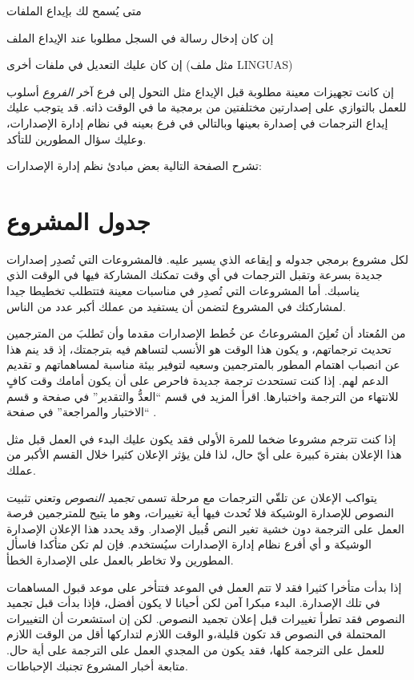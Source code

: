 \startitemize[1]
\item متى يُسمح لك بإيداع الملفات
\item إن كان إدخال رسالة في السجل مطلوبا عند الإيداع الملف
\item إن كان عليك التعديل في ملفات أخرى (مثل ملف LINGUAS)
\item إن كانت تجهيزات معينة مطلوبة قبل الإيداع مثل التحول إلى فرع آخر
\stopitemize
{\it الفروع} أسلوب للعمل بالتوازي على إصدارتين مختلفتين من برمجية ما في
الوقت ذاته. قد يتوجب عليك إيداع الترجمات في إصدارة بعينها وبالتالي في
فرع بعينه في نظام إدارة الإصدارات، وعليك سؤال المطورين للتأكد.

تشرح الصفحة التالية بعض مبادئ نظم إدارة الإصدارات:


\section{جدول المشروع}
لكل مشروع برمجي جدوله و إيقاعه الذي يسير عليه. فالمشروعات التي تُصدِر
إصدارات جديدة بسرعة وتقبل الترجمات في أي وقت تمكنك المشاركة فيها في
الوقت الذي يناسبك. أما المشروعات التي تُصدِر في مناسبات معينة فتتطلب
تخطيطا جيدا لمشاركتك في المشروع لتضمن أن يستفيد من عملك أكبر عدد من
الناس.

من المُعتاد أن تُعلِنَ المشروعاتُ عن خُطط الإصدارات مقدما وأن تَطلبَ من
المترجمين تحديث ترجماتهم، و يكون هذا الوقت هو الأنسب لتساهم فيه
بترجمتك، إذ قد ينم هذا عن انصباب اهتمام المطور بالمترجمين وسعيه لتوفير
بيئة مناسبة لمساهماتهم و تقديم الدعم لهم. إذا كنت تستحدث ترجمة جديدة
فاحرص على أن يكون أمامك وقت كافٍ للانتهاء من الترجمة واختبارها. اقرأ
المزيد في قسم “العدُّ والتقدير” في صفحة \at[ref:33531520] و
قسم “الاختبار والمراجعة” في صفحة \at[ref:34441726].

إذا كنت تترجم مشروعا ضخما للمرة الأولى فقد يكون عليك البدء في العمل قبل
مثل هذا الإعلان بفترة كبيرة على أيّ حال، لذا فلن يؤثر الإعلان كثيرا
خلال القسم الأكبر من عملك.

يتواكب الإعلان عن تلقّي الترجمات مع مرحلة تسمى {\it تجميد النصوص} وتعني
تثبيت النصوص للإصدارة الوشيكة فلا تُحدث فيها أية تغييرات، وهو ما يتيح
للمترجمين فرصة العمل على الترجمة دون خشية تغير النص قُبيل الإصدار. وقد
يحدد هذا الإعلان الإصدارة الوشيكة و أي أفرع نظام إدارة الإصدارات
سيُستخدم. فإن لم تكن متأكدا فاسأل المطورين ولا تخاطر بالعمل على
الإصدارة الخطأ.

إذا بدأت متأخرا كثيرا فقد لا تتم العمل في الموعد فتتأخر على موعد قبول
المساهمات في تلك الإصدارة. البدء مبكرا آمن لكن أحيانا لا يكون أفضل،
فإذا بدأت قبل تجميد النصوص فقد تطرأ تغييرات قبل إعلان تجميد النصوص. لكن
إن استشعرت أن التغييرات المحتملة في النصوص قد تكون قليلة،و الوقت اللازم
لتداركها أقل من الوقت اللازم للعمل على الترجمة كلها، فقد يكون من المجدي
العمل على الترجمة على أية حال. متابعة أخبار المشروع تجنبك الإحباطات.

